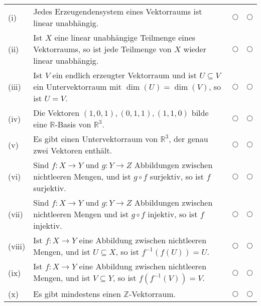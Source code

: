\documentclass[11pt]{report} %
\newcommand\bR{\mathbb{R}}
\newcommand\bZ{\mathbb{Z}}
\begin{document}
		\renewcommand{\arraystretch}{1.5}
		\medskip\noindent
		\begin{tabularx}{\textwidth}{l X l l}
			& & \text{Wahr} & \text{Falsch} \\
			\hline
			(i) & Jedes Erzeugendensystem eines Vektorraums ist linear unabhängig. & $\bigcirc$ & $\bigcirc$ \\
			(ii) & Ist $X$ eine linear unabhängige Teilmenge eines Vektorraums, so ist jede Teilmenge von $X$ wieder linear unabhängig. & $\bigcirc$ & $\bigcirc$ \\
			(iii) & Ist $V$ ein endlich erzeugter Vektorraum und ist $U \subseteq V$ ein Untervektorraum mit $\dim(U) = \dim(V)$, so ist $U = V$. & $\bigcirc$ & $\bigcirc$ \\
			(iv) & Die Vektoren $(1,0,1), (0,1,1), (1,1,0)$ bilde eine $\bR$-Basis von $\bR^3$. & $\bigcirc$ & $\bigcirc$ \\
			(v) & Es gibt einen Untervektorraum von $\bR^3$, der genau zwei Vektoren enthält. & $\bigcirc$ & $\bigcirc$ \\
			(vi) & Sind $f: X \rightarrow Y$ und $g: Y \rightarrow Z$ Abbildungen zwischen nichtleeren Mengen, und ist $g \circ f$ surjektiv, so ist $f$ surjektiv. & $\bigcirc$ & $\bigcirc$ \\
			(vii) & Sind $f: X \rightarrow Y$ und $g: Y \rightarrow Z$ Abbildungen zwischen nichtleeren Mengen und ist $g \circ f$ injektiv, so ist $f$ injektiv. & $\bigcirc$ & $\bigcirc$ \\
			(viii) & Ist $f: X \rightarrow Y$ eine Abbildung zwischen nichtleeren Mengen, und ist $U \subseteq X$, so ist $f^{-1}(f(U)) = U$. & $\bigcirc$ & $\bigcirc$ \\
			(ix) & Ist $f: X \rightarrow Y$ eine Abbildung zwischen nichtleeren Mengen, und ist $V \subseteq Y$, so ist $f(f^{-1}(V)) = V$. & $\bigcirc$ & $\bigcirc$ \\
			(x) & Es gibt mindestens einen $\bZ$-Vektorraum. & $\bigcirc$ & $\bigcirc$ \\
		\end{tabularx}			
	
\end{document}
